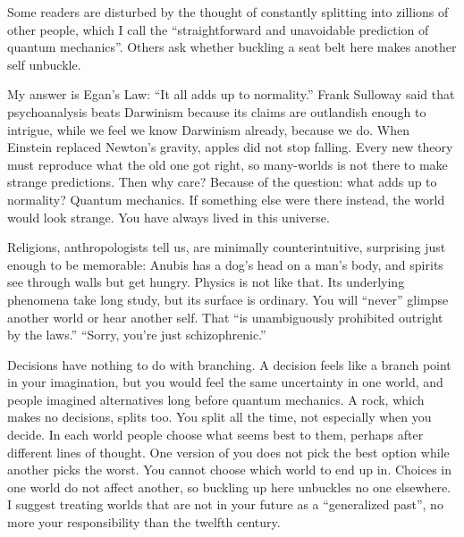 
Some readers are disturbed by the thought of constantly splitting into zillions of other people, which I call the ``straightforward and unavoidable prediction of quantum mechanics''.  Others ask whether buckling a seat belt here makes another self unbuckle.

My answer is Egan's Law: ``It all adds up to normality.'' Frank Sulloway said that psychoanalysis beats Darwinism because its claims are outlandish enough to intrigue, while we feel we know Darwinism already, because we do. When Einstein replaced Newton's gravity, apples did not stop falling. Every new theory must reproduce what the old one got right, so many-worlds is not there to make strange predictions. Then why care? Because of the question: what adds up to normality? Quantum mechanics. If something else were there instead, the world would look strange. You have always lived in this universe.

Religions, anthropologists tell us, are minimally counterintuitive, surprising just enough to be memorable: Anubis has a dog's head on a man's body, and spirits see through walls but get hungry. Physics is not like that. Its underlying phenomena take long study, but its surface is ordinary. You will ``never'' glimpse another world or hear another self. That ``is unambiguously prohibited outright by the laws.'' ``Sorry, you're just schizophrenic.'' 

Decisions have nothing to do with branching. A decision feels like a branch point in your imagination, but you would feel the same uncertainty in one world, and people imagined alternatives long before quantum mechanics. A rock, which makes no decisions, splits too. You split all the time, not especially when you decide. In each world people choose what seems best to them, perhaps after different lines of thought. One version of you does not pick the best option while another picks the worst. You cannot choose which world to end up in. Choices in one world do not affect another, so buckling up here unbuckles no one elsewhere. I suggest treating worlds that are not in your future as a ``generalized past'', no more your responsibility than the twelfth century.

